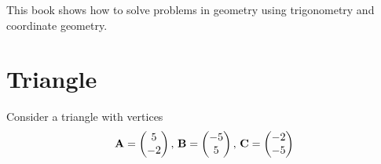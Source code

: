 \documentclass[10pt]{book}
\begin{document}
\frontmatter
\subtitle{Through Algebra}
\titlepage
\tableofcontents
\setcounter{page}{0}
\begin{introduction}
This book shows how to solve problems in geometry using trigonometry and coordinate geometry.
\end{introduction}
\mainmatter
\chapter{Triangle}
Consider a triangle with vertices
                \begin{align}
                        \label{eq:tri-pts}
                        \vec{A} = \myvec{5 \\ -2},\,
                        \vec{B} = \myvec{-5 \\ 5},\,
                        \vec{C} = \myvec{-2 \\ -5}
                \end{align}
\end{document}
